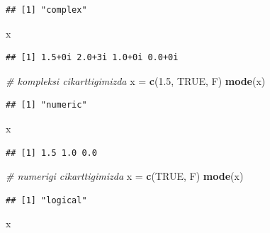 \documentclass[]{book}
\newenvironment{Shaded}{\begin{snugshade}}{\end{snugshade}}
\newcommand{\CommentTok}[1]{\textcolor[rgb]{0.56,0.35,0.01}{\textit{#1}}}
\newcommand{\FloatTok}[1]{\textcolor[rgb]{0.00,0.00,0.81}{#1}}
\newcommand{\KeywordTok}[1]{\textcolor[rgb]{0.13,0.29,0.53}{\textbf{#1}}}
\newcommand{\NormalTok}[1]{#1}
\newcommand{\OtherTok}[1]{\textcolor[rgb]{0.56,0.35,0.01}{#1}}
\newcommand{\StringTok}[1]{\textcolor[rgb]{0.31,0.60,0.02}{#1}}
\begin{document}
\begin{verbatim}
## [1] "complex"
\end{verbatim}

\begin{Shaded}
\begin{Highlighting}[]
\NormalTok{x }
\end{Highlighting}
\end{Shaded}

\begin{verbatim}
## [1] 1.5+0i 2.0+3i 1.0+0i 0.0+0i
\end{verbatim}

\begin{Shaded}
\begin{Highlighting}[]
\CommentTok{# kompleksi cikarttigimizda}
\NormalTok{x =}\StringTok{ }\KeywordTok{c}\NormalTok{(}\FloatTok{1.5}\NormalTok{, }\OtherTok{TRUE}\NormalTok{, F)}
\KeywordTok{mode}\NormalTok{(x)}
\end{Highlighting}
\end{Shaded}

\begin{verbatim}
## [1] "numeric"
\end{verbatim}

\begin{Shaded}
\begin{Highlighting}[]
\NormalTok{x}
\end{Highlighting}
\end{Shaded}

\begin{verbatim}
## [1] 1.5 1.0 0.0
\end{verbatim}

\begin{Shaded}
\begin{Highlighting}[]
\CommentTok{# numerigi cikarttigimizda}
\NormalTok{x =}\StringTok{ }\KeywordTok{c}\NormalTok{(}\OtherTok{TRUE}\NormalTok{, F)}
\KeywordTok{mode}\NormalTok{(x)}
\end{Highlighting}
\end{Shaded}

\begin{verbatim}
## [1] "logical"
\end{verbatim}

\begin{Shaded}
\begin{Highlighting}[]
\NormalTok{x}
\end{Highlighting}
\end{Shaded}
\end{document}
